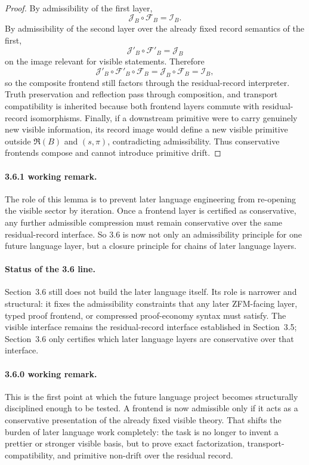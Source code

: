 \begin{proof}
By admissibility of the first layer,
\[
  \mathcal J_B\circ \mathcal F_B=\mathcal I_B.
\]
By admissibility of the second layer over the already fixed record semantics of the first,
\[
  \mathcal J'_B\circ \mathcal F'_B=\mathcal J_B
\]
on the image relevant for visible statements. Therefore
\[
  \mathcal J'_B\circ \mathcal F'_B\circ \mathcal F_B
  =\mathcal J_B\circ \mathcal F_B
  =\mathcal I_B,
\]
so the composite frontend still factors through the residual-record interpreter. Truth preservation and reflection pass through composition, and transport compatibility is inherited because both frontend layers commute with residual-record isomorphisms. Finally, if a downstream primitive were to carry genuinely new visible information, its record image would define a new visible primitive outside \(\mathfrak R(B)\) and \((s,\pi)\), contradicting admissibility. Thus conservative frontends compose and cannot introduce primitive drift.
\end{proof}

\paragraph{3.6.1 working remark.}
The role of this lemma is to prevent later language engineering from re-opening the visible sector by iteration. Once a frontend layer is certified as conservative, any further admissible compression must remain conservative over the same residual-record interface. So 3.6 is now not only an admissibility principle for one future language layer, but a closure principle for chains of later language layers.

\paragraph{Status of the 3.6 line.}
Section~3.6 still does not build the later language itself. Its role is narrower and structural: it fixes the admissibility constraints that any later ZFM-facing layer, typed proof frontend, or compressed proof-economy syntax must satisfy. The visible interface remains the residual-record interface established in Section~3.5; Section~3.6 only certifies which later language layers are conservative over that interface.



\paragraph{3.6.0 working remark.}
This is the first point at which the future language project becomes structurally disciplined enough to be tested. A frontend is now admissible only if it acts as a conservative presentation of the already fixed visible theory. That shifts the burden of later language work completely: the task is no longer to invent a prettier or stronger visible basis, but to prove exact factorization, transport-compatibility, and primitive non-drift over the residual record.

